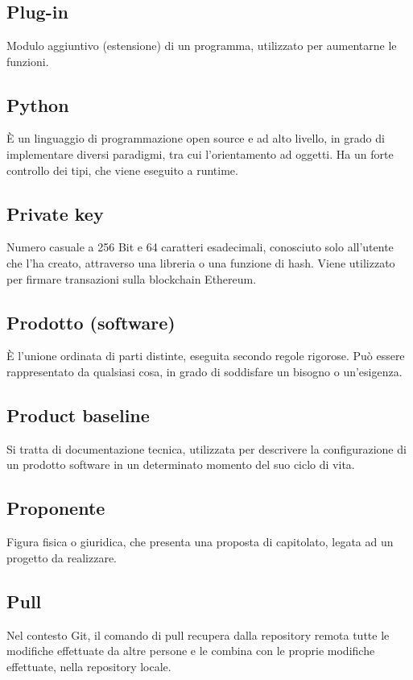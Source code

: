 \section[P]{}
	\subsection*{Plug-in}
	Modulo aggiuntivo (estensione) di un programma, utilizzato per aumentarne le funzioni.
	\subsection*{Python}
	È un linguaggio di programmazione open source e ad alto livello, in grado di implementare diversi paradigmi, tra cui l’orientamento ad oggetti. Ha un forte controllo dei tipi, che viene eseguito a runtime.
	\subsection*{Private key}
	Numero casuale a 256 Bit e 64 caratteri esadecimali, conosciuto solo all’utente che l’ha creato, attraverso una libreria o una funzione di hash. Viene utilizzato per firmare transazioni sulla blockchain Ethereum.
	\subsection*{Prodotto (software)}
	È l’unione ordinata di parti distinte, eseguita secondo regole rigorose. Può essere rappresentato da qualsiasi cosa, in grado di soddisfare un bisogno o un’esigenza.
	\subsection*{Product baseline}
	Si tratta di documentazione tecnica, utilizzata per descrivere la configurazione di un prodotto software in un determinato momento del suo ciclo di vita.
	\subsection*{Proponente}
	Figura fisica o giuridica, che presenta una proposta di capitolato, legata ad un progetto da realizzare.
	\subsection*{Pull}
	Nel contesto Git, il comando di pull recupera dalla repository remota tutte le modifiche effettuate da altre persone e le combina con le proprie modifiche effettuate, nella repository locale.
